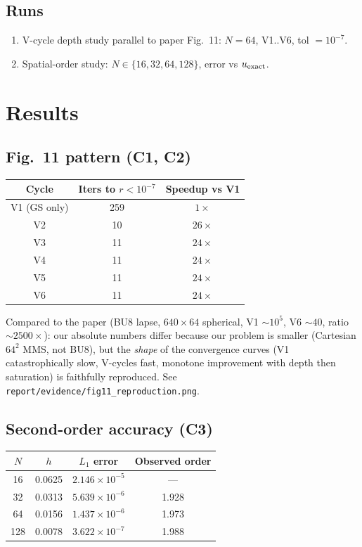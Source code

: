 \documentclass[11pt]{article}
\begin{document}
\subsection{Runs}
\begin{enumerate}
  \item V-cycle depth study parallel to paper Fig.~11: $N=64$, V1..V6, tol $= 10^{-7}$.
  \item Spatial-order study: $N \in \{16,32,64,128\}$, error vs $u_{\rm exact}$.
\end{enumerate}

\section{Results}

\subsection{Fig.~11 pattern (C1, C2)}

\begin{center}
\begin{tabular}{ccc}\toprule
Cycle & Iters to $r < 10^{-7}$ & Speedup vs V1 \\ \midrule
V1 (GS only) & 259 & $1\times$ \\
V2 & 10 & $26\times$ \\
V3 & 11 & $24\times$ \\
V4 & 11 & $24\times$ \\
V5 & 11 & $24\times$ \\
V6 & 11 & $24\times$ \\ \bottomrule
\end{tabular}
\end{center}

Compared to the paper (BU8 lapse, $640\times 64$ spherical, V1 $\sim 10^5$, V6 $\sim 40$, ratio $\sim 2500\times$): our absolute numbers differ because our problem is smaller (Cartesian $64^2$ MMS, not BU8), but the \emph{shape} of the convergence curves (V1 catastrophically slow, V-cycles fast, monotone improvement with depth then saturation) is faithfully reproduced. See \texttt{report/evidence/fig11\_reproduction.png}.

\subsection{Second-order accuracy (C3)}

\begin{center}
\begin{tabular}{cccc}\toprule
$N$ & $h$ & $L_1$ error & Observed order \\ \midrule
16 & 0.0625 & $2.146\times 10^{-5}$ & --- \\
32 & 0.0313 & $5.639\times 10^{-6}$ & 1.928 \\
64 & 0.0156 & $1.437\times 10^{-6}$ & 1.973 \\
128 & 0.0078 & $3.622\times 10^{-7}$ & 1.988 \\ \bottomrule
\end{tabular}
\end{center}
\end{document}
